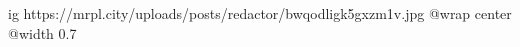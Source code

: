  
 
 
 
 

\ifcmt
  ig https://mrpl.city/uploads/posts/redactor/bwqodligk5gxzm1v.jpg
  @wrap center
  @width 0.7
\fi
